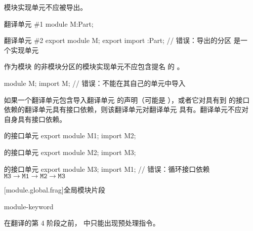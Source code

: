 \pnum
模块实现单元不应被导出。
\begin{example}
\begin{codeblocktu}{翻译单元 \#1}
module M:Part;
\end{codeblocktu}

\begin{codeblocktu}{翻译单元 \#2}
export module M;
export import :Part;    // 错误：导出的分区  是一个实现单元
\end{codeblocktu}
\end{example}

\pnum
作为模块  的非模块分区的模块实现单元不应包含提名  的 。
\begin{example}
\begin{codeblock}
module M;
import M;               // 错误：不能在其自己的单元中导入 
\end{codeblock}
\end{example}

\pnum
如果一个翻译单元包含导入翻译单元  的声明（可能是 ），或者它对具有到  的接口依赖的翻译单元具有接口依赖，则该翻译单元对翻译单元  具有。翻译单元不应对自身具有接口依赖。
\begin{example}
\begin{codeblocktu}{ 的接口单元}
export module M1;
import M2;
\end{codeblocktu}

\begin{codeblocktu}{ 的接口单元}
export module M2;
import M3;
\end{codeblocktu}

\begin{codeblocktu}{ 的接口单元}
export module M3;
import M1;              // 错误：循环接口依赖 $\mathtt{M3} \rightarrow \mathtt{M1} \rightarrow \mathtt{M2} \rightarrow \mathtt{M3}$
\end{codeblocktu}
\end{example}

[module.global.frag]{全局模块片段}

\begin{bnf}
\br
    module-keyword \terminal{;} 
\end{bnf}

\pnum
\begin{note}
在翻译的第 4 阶段之前， 中只能出现预处理指令。
\end{note}

